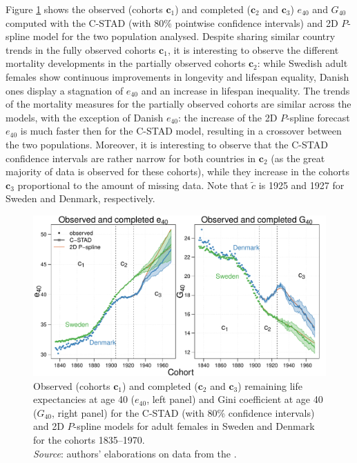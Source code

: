 \documentclass[11pt, a4paper]{article}
\begin{document}
Figure \ref{Fig:CSTADforeE40G40} shows the observed (cohorts $\bm{c}_1$) and completed ($\bm{c}_2$ and $\bm{c}_3$) $e_{40}$ and $G_{40}$ computed with the C-STAD (with 80\% pointwise confidence intervals) and 2D $P$-spline model for the two population analysed. Despite sharing similar country trends in the fully observed cohorts $\bm{c}_1$, it is interesting to observe the different mortality developments in the partially observed cohorts $\bm{c}_2$: while Swedish adult females show continuous improvements in longevity and lifespan equality, Danish ones display a stagnation of $e_{40}$ and an increase in lifespan inequality. The trends of the mortality measures for the partially observed cohorts are similar across the models, with the exception of Danish $e_{40}$: the increase of the 2D $P$-spline forecast $e_{40}$ is much faster then for the C-STAD model, resulting in a crossover between the two populations. Moreover, it is interesting to observe that the C-STAD confidence intervals are rather narrow for both countries in $\bm{c}_2$ (as the great majority of data is observed for these cohorts), while they increase in the cohorts $\bm{c}_3$ proportional to the amount of missing data. Note that $\tilde{c}$ is 1925 and 1927 for Sweden and Denmark, respectively.  

\begin{figure}[t]
	\begin{center}
		\includegraphics[scale=0.57]{./Figures/F6.pdf} 
		\caption{Observed (cohorts $\bm{c}_1$) and completed ($\bm{c}_2$ and $\bm{c}_3$) remaining life expectancies at age 40 ($e_{40}$, left panel) and Gini coefficient at age 40 ($G_{40}$, right panel) for the C-STAD (with 80\% confidence intervals) and 2D $P$-spline models for adult females in Sweden and Denmark for the cohorts 1835--1970.\\ \small \textit{Source}: authors' elaborations on data from the \cite{HMD}.\label{Fig:CSTADforeE40G40}}    
	\end{center}
\end{figure}
\end{document}
